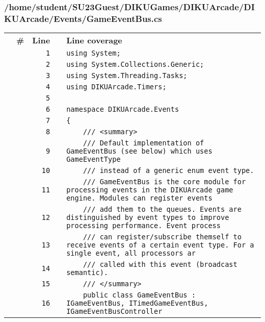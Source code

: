 \documentclass[a4paper,landscape,10pt]{article}
\begin{document}
\subsubsection{/home/student/SU23Guest/DIKUGames/DIKUArcade/DIKUArcade/Events/GameEventBus.cs}
\begin{longtable}[l]{lrrll}
\textbf{} & \textbf{\#} & \textbf{Line} & \textbf{} & \textbf{Line coverage}\\
\cellcolor{gray} &  & \verb~1~ & & \verb~using System;~\\
\cellcolor{gray} &  & \verb~2~ & & \verb~using System.Collections.Generic;~\\
\cellcolor{gray} &  & \verb~3~ & & \verb~using System.Threading.Tasks;~\\
\cellcolor{gray} &  & \verb~4~ & & \verb~using DIKUArcade.Timers;~\\
\cellcolor{gray} &  & \verb~5~ & & \verb~~\\
\cellcolor{gray} &  & \verb~6~ & & \verb~namespace DIKUArcade.Events~\\
\cellcolor{gray} &  & \verb~7~ & & \verb~{~\\
\cellcolor{gray} &  & \verb~8~ & & \verb~    /// <summary>~\\
\cellcolor{gray} &  & \verb~9~ & & \verb~    /// Default implementation of GameEventBus (see below) which uses GameEventType~\\
\cellcolor{gray} &  & \verb~10~ & & \verb~    /// instead of a generic enum event type.~\\
\cellcolor{gray} &  & \verb~11~ & & \verb~    /// GameEventBus is the core module for processing events in the DIKUArcade game engine. Modules can register events~\\
\cellcolor{gray} &  & \verb~12~ & & \verb~    /// add them to the queues. Events are distinguished by event types to improve processing performance. Event process~\\
\cellcolor{gray} &  & \verb~13~ & & \verb~    /// can register/subscribe themself to receive events of a certain event type. For a single event, all processors ar~\\
\cellcolor{gray} &  & \verb~14~ & & \verb~    /// called with this event (broadcast semantic).~\\
\cellcolor{gray} &  & \verb~15~ & & \verb~    /// </summary>~\\
\cellcolor{gray} &  & \verb~16~ & & \verb~    public class GameEventBus : IGameEventBus, ITimedGameEventBus, IGameEventBusController~\\

\end{longtable}
\end{document}
